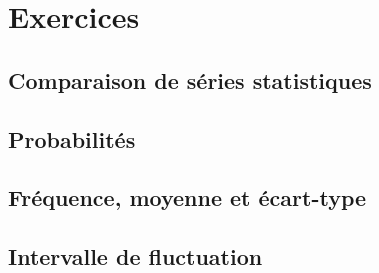 \section{Exercices}

\subsection{Comparaison de séries statistiques}


\subsection{Probabilités}


\subsection{Fréquence, moyenne et écart-type}


\subsection{Intervalle de fluctuation}

